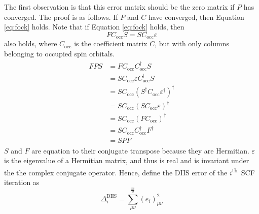 \documentclass[final,3p,times,twocolumn]{elsarticle}
\newcommand{\ssth}{\textsuperscript{th}}
\begin{document}
The first observation is that this error matrix should be the zero matrix if $P$ has converged. The proof is as follows. If $P$ and $C$ have converged, then Equation \eqref{eq:fock} holds. Note that if Equation \eqref{eq:fock} holds, then
\begin{equation}
FC_{\text{occ}}S = SC_{\text{occ}}\varepsilon
\end{equation}
also holds, where $C_{\text{occ}}$ is the coefficient matrix $C$, but with only columns belonging to occupied spin orbitals. 
\begin{align}
\begin{split}
FPS & = FC_{\text{occ}}C_{\text{occ}}^\dagger S \\
& = SC_{\text{occ}}\varepsilon C_{\text{occ}}^\dagger S \\
& = SC_{\text{occ}}(S^\dagger C_{\text{occ}}\varepsilon^\dagger)^\dagger \\
& = SC_{\text{occ}}(S C_{\text{occ}}\varepsilon)^\dagger \\
& = SC_{\text{occ}}(FC_{\text{occ}})^\dagger \\
& = SC_{\text{occ}}C_{\text{occ}}^\dagger F^\dagger \\
& = SPF
\end{split}
\end{align}
$S$ and $F$ are equation to their conjugate transpose because they are Hermitian. $\varepsilon$ is the eigenvalue of a Hermitian matrix, and thus is real and is invariant under the the complex conjugate operator. Hence, define the DIIS error of the $i$\ssth\ SCF iteration as
\begin{equation} \label{eq:diiserrorterm}
\Delta_i^{\text{DIIS}} = \sum_{\mu\nu}^\frac{m}{2} (e_i)_{\mu\nu}^2
\end{equation}
\end{document}
